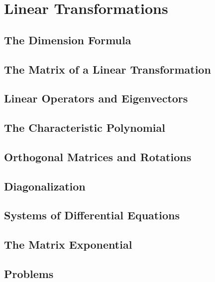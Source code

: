 \chapter{Linear Transformations}
\section{The Dimension Formula}
\section{The Matrix of a Linear Transformation}
\section{Linear Operators and Eigenvectors}
\section{The Characteristic Polynomial}
\section{Orthogonal Matrices and Rotations}
\section{Diagonalization}
\section{Systems of Differential Equations}
\section{The Matrix Exponential}
\section{Problems}